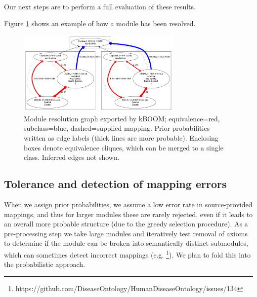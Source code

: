 \documentclass{my}
\begin{document}
Our next steps are to perform a full evaluation of these results.

Figure \ref{fig:graph} shows an example of how a module has been
resolved.

\begin{figure}
\center
\includegraphics[width=8cm]{amyloidosis}
\caption{Module resolution graph exported by kBOOM; equivalence=red,
  subclass=blue, dashed=supplied mapping. Prior probabilities written
  as edge labels (thick lines are more probable). Enclosing boxes
  denote equivalence cliques, which can be merged to a single class. Inferred edges not shown.}
\label{fig:graph}
\end{figure}

\subsection{Tolerance and detection of mapping errors}

When we assign prior probabilities, we assume a low error rate in
source-provided mappings, and thus for larger modules these are rarely
rejected, even if it leads to an overall more probable structure (due
to the greedy selection procedure). As a pre-processing step we
take large modules and iteratively test removal of axioms to determine
if the module can be broken into semantically distinct submodules, which
can sometimes detect incorrect mappings (e.g. \footnote{https://github.com/DiseaseOntology/HumanDiseaseOntology/issues/134}). We
plan to fold this into the probabilistic approach.


\end{document}
